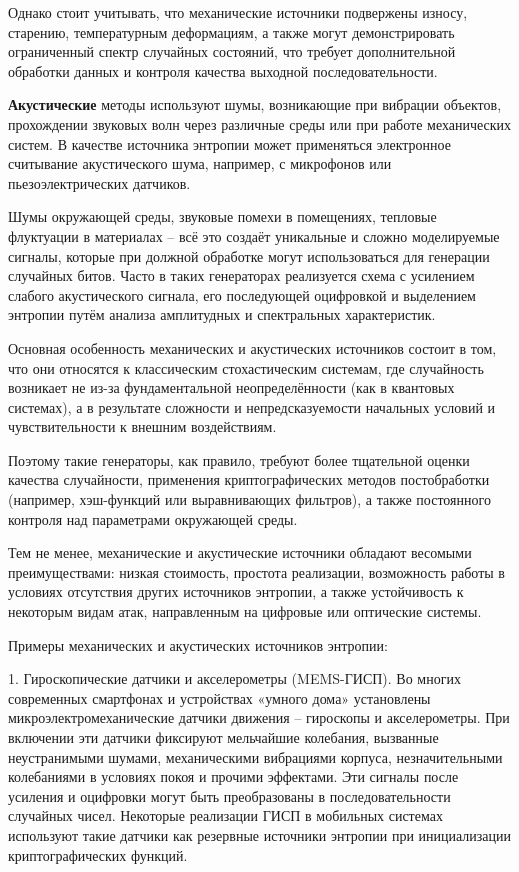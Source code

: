 Однако стоит учитывать, что механические источники подвержены износу,
старению, температурным деформациям, а также могут демонстрировать
ограниченный спектр случайных состояний, что требует дополнительной
обработки данных и контроля качества выходной последовательности.

\textbf{Акустические} методы используют шумы, возникающие при вибрации
объектов, прохождении звуковых волн через различные среды или при работе
механических систем. В качестве источника энтропии может применяться
электронное считывание акустического шума, например, с микрофонов или
пьезоэлектрических датчиков.

Шумы окружающей среды, звуковые помехи в помещениях, тепловые флуктуации
в материалах -- всё это создаёт уникальные и сложно моделируемые
сигналы, которые при должной обработке могут использоваться для
генерации случайных битов. Часто в таких генераторах реализуется схема с
усилением слабого акустического сигнала, его последующей оцифровкой и
выделением энтропии путём анализа амплитудных и спектральных
характеристик.

Основная особенность механических и акустических источников состоит в
том, что они относятся к классическим стохастическим системам, где
случайность возникает не из-за фундаментальной неопределённости (как в
квантовых системах), а в результате сложности и непредсказуемости
начальных условий и чувствительности к внешним воздействиям.

Поэтому такие генераторы, как правило, требуют более тщательной оценки
качества случайности, применения криптографических методов постобработки
(например, хэш-функций или выравнивающих фильтров), а также постоянного
контроля над параметрами окружающей среды.

Тем не менее, механические и акустические источники обладают весомыми
преимуществами: низкая стоимость, простота реализации, возможность
работы в условиях отсутствия других источников энтропии, а также
устойчивость к некоторым видам атак, направленным на цифровые или
оптические системы.

Примеры механических и акустических источников энтропии:

1. Гироскопические датчики и акселерометры (MEMS-ГИСП). Во многих
современных смартфонах и устройствах «умного дома» установлены
микроэлектромеханические датчики движения -- гироскопы и акселерометры.
При включении эти датчики фиксируют мельчайшие колебания, вызванные
неустранимыми шумами, механическими вибрациями корпуса, незначительными
колебаниями в условиях покоя и прочими эффектами. Эти сигналы после
усиления и оцифровки могут быть преобразованы в последовательности
случайных чисел. Некоторые реализации ГИСП в мобильных системах
используют такие датчики как резервные источники энтропии при
инициализации криптографических функций.

